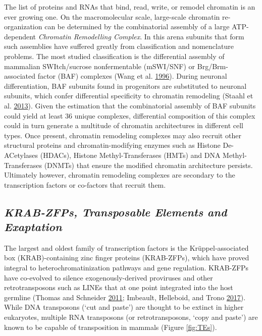 \documentclass[onehalf,12pt]{beavtex}
\begin{document}
  The list of proteins and RNAs that bind, read, write, or remodel
  chromatin is an ever growing one. On the macromolecular scale,
  large-scale chromatin re-organization can be determined by the
  combinatorial assembly of a large ATP-dependent \emph{Chromatin
  Remodelling Complex}. In this arena subunits that form such assemblies
  have suffered greatly from classification and nomenclature problems. The
  most studied classification is the differential assembly of mammalian
  SWItch/sucrose nonfermentable (mSWI/SNF) or Brg/Brm-associated factor
  (BAF) complexes (Wang et al.
  \protect\hyperlink{ref-WangPurificationbiochemicalheterogeneity1996}{1996}).
  During neuronal differentiation, BAF subunits found in progenitors are
  substituted to neuronal subunits, which confer differential specificity
  to chromatin remodeling (Staahl et al.
  \protect\hyperlink{ref-StaahlKineticAnalysisnpBAF2013}{2013}). Given the
  estimation that the combinatorial assembly of BAF subunits could yield
  at least 36 unique complexes, differential composition of this complex
  could in turn generate a multitude of chromatin architectures in
  different cell types. Once present, chromatin remodeling complexes may
  also recruit other structural proteins and chromatin-modifying enzymes
  such as Histone De-ACetylases (HDACs), Histone Methyl-Transferases
  (HMTs) and DNA Methyl-Transferases (DNMTs) that ensure the modified
  chromatin architecture persists. Ultimately however, chromatin
  remodeling complexes are secondary to the transcription factors or
  co-factors that recruit them.
  
  \subsection*{\texorpdfstring{\emph{KRAB-ZFPs, Transposable Elements and
  Exaptation}}{KRAB-ZFPs, Transposable Elements and Exaptation}}\label{krab-zfps-transposable-elements-and-exaptation}
  
  The largest and oldest family of transcription factors is the
  Krüppel-associated box (KRAB)-containing zinc finger proteins
  (KRAB-ZFPs), which have proved integral to heterochromatinization
  pathways and gene regulation. KRAB-ZFPs have co-evolved to silence
  exogenously-derived proviruses and other retrotransposons such as LINEs
  that at one point integrated into the host germline (Thomas and
  Schneider
  \protect\hyperlink{ref-ThomasCoevolutionretroelementstandem2011}{2011};
  Imbeault, Helleboid, and Trono
  \protect\hyperlink{ref-ImbeaultKRABzincfingerproteins2017}{2017}). While
  DNA transposons (`cut and paste') are thought to be extinct in higher
  eukaryotes, multiple RNA transposons (or retrotransposons, `copy and
  paste') are known to be capable of transposition in mammals (Figure
  \ref{fig:TEs}).
  
\end{document}
